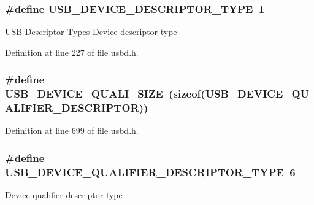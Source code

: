 \subsubsection[{\texorpdfstring{U\+S\+B\+\_\+\+D\+E\+V\+I\+C\+E\+\_\+\+D\+E\+S\+C\+R\+I\+P\+T\+O\+R\+\_\+\+T\+Y\+PE}{USB_DEVICE_DESCRIPTOR_TYPE}}]{\setlength{\rightskip}{0pt plus 5cm}\#define U\+S\+B\+\_\+\+D\+E\+V\+I\+C\+E\+\_\+\+D\+E\+S\+C\+R\+I\+P\+T\+O\+R\+\_\+\+T\+Y\+PE~1}\hypertarget{group__USBD__Core_ga722f2d6ee2892228b6708e8b9904c645}{}\label{group__USBD__Core_ga722f2d6ee2892228b6708e8b9904c645}
U\+SB Descriptor Types Device descriptor type 

Definition at line 227 of file usbd.\+h.

\subsubsection[{\texorpdfstring{U\+S\+B\+\_\+\+D\+E\+V\+I\+C\+E\+\_\+\+Q\+U\+A\+L\+I\+\_\+\+S\+I\+ZE}{USB_DEVICE_QUALI_SIZE}}]{\setlength{\rightskip}{0pt plus 5cm}\#define U\+S\+B\+\_\+\+D\+E\+V\+I\+C\+E\+\_\+\+Q\+U\+A\+L\+I\+\_\+\+S\+I\+ZE~(sizeof({\bf U\+S\+B\+\_\+\+D\+E\+V\+I\+C\+E\+\_\+\+Q\+U\+A\+L\+I\+F\+I\+E\+R\+\_\+\+D\+E\+S\+C\+R\+I\+P\+T\+OR}))}\hypertarget{group__USBD__Core_ga038630c136094c9f727b62cb81a9a186}{}\label{group__USBD__Core_ga038630c136094c9f727b62cb81a9a186}


Definition at line 699 of file usbd.\+h.

\subsubsection[{\texorpdfstring{U\+S\+B\+\_\+\+D\+E\+V\+I\+C\+E\+\_\+\+Q\+U\+A\+L\+I\+F\+I\+E\+R\+\_\+\+D\+E\+S\+C\+R\+I\+P\+T\+O\+R\+\_\+\+T\+Y\+PE}{USB_DEVICE_QUALIFIER_DESCRIPTOR_TYPE}}]{\setlength{\rightskip}{0pt plus 5cm}\#define U\+S\+B\+\_\+\+D\+E\+V\+I\+C\+E\+\_\+\+Q\+U\+A\+L\+I\+F\+I\+E\+R\+\_\+\+D\+E\+S\+C\+R\+I\+P\+T\+O\+R\+\_\+\+T\+Y\+PE~6}\hypertarget{group__USBD__Core_ga7158946184590ea6cfcb406d7f3c4ce5}{}\label{group__USBD__Core_ga7158946184590ea6cfcb406d7f3c4ce5}
Device qualifier descriptor type 


